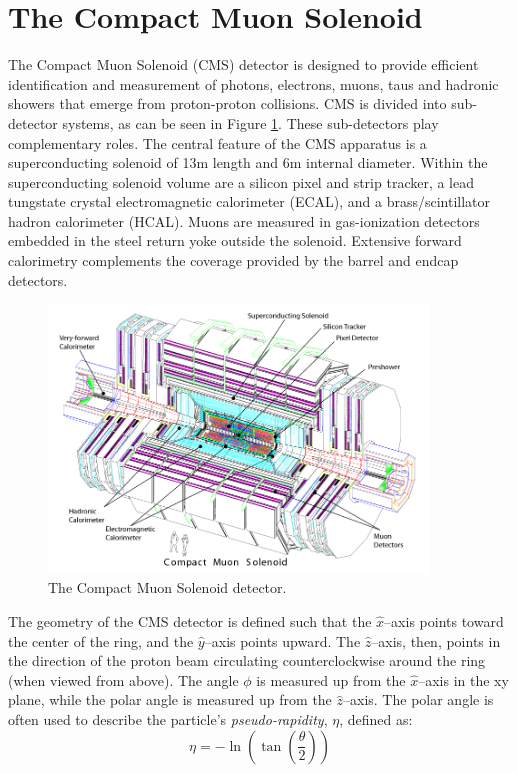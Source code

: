 \section{The Compact Muon Solenoid}

The Compact Muon Solenoid (CMS) detector is designed to provide efficient identification and 
measurement of photons, electrons, muons, taus and hadronic showers that emerge
from proton-proton collisions.
CMS is divided into sub-detector systems, as can be seen in Figure \ref{fig:cms_complete}.
These sub-detectors play complementary roles.
The central feature of the CMS apparatus is a superconducting solenoid of 13\unit{m} length and 6\unit{m} internal diameter. Within the superconducting solenoid volume are a silicon pixel and strip tracker, a lead tungstate crystal electromagnetic calorimeter (ECAL), and a brass/scintillator hadron calorimeter (HCAL). Muons are measured in gas-ionization detectors embedded in the steel return yoke outside the solenoid. Extensive forward calorimetry complements the coverage provided by the barrel and endcap detectors. 
\begin{figure}[htbp] 
\centering
\includegraphics[width=0.9\textwidth]{plots/intro/cms_complete.png}
\caption{The Compact Muon Solenoid detector.\label{fig:cms_complete}}
\end{figure}

The geometry of the CMS detector is defined such that the $\hat{x}$--axis points toward the
center of the ring, and the $\hat{y}$--axis points upward. The $\hat{z}$--axis, then, points in
the direction of the proton beam circulating counterclockwise around the ring (when viewed
from above). The angle $\phi$ is measured up from the $\hat{x}$--axis in the xy plane, while
the polar angle is measured up from the $\hat{z}$--axis. The polar angle is often used to describe
the particle's {\it pseudo-rapidity}, $\eta$, defined as:
\begin{equation}
\eta = -\ln\left(\tan\left(\frac{\theta}{2}\right)\right)
\end{equation}

